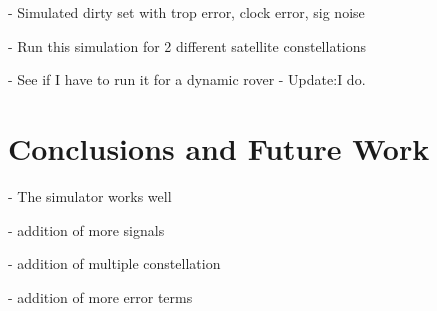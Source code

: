 \documentclass[12pt]{report}
\begin{document}
        - Simulated dirty set with trop error, clock error, sig noise

        - Run this simulation for 2 different satellite constellations

        - See if I have to run it for a dynamic rover 
            - Update:I do.




\chapter{Conclusions and Future Work}
- The simulator works well 

- addition of more signals

- addition of multiple constellation

- addition of more error terms













\end{document}
